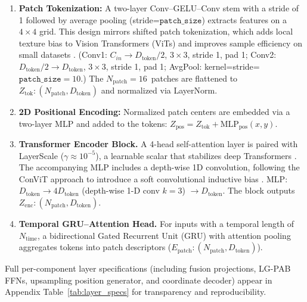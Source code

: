 \documentclass[remotesensing,article,accept,pdftex,moreauthors]{Definitions/mdpi}
\renewcommand{\hl}[1]{#1}
\begin{document}
\begin{enumerate}[leftmargin=*]
\item \textbf{\hl{Patch Tokenization:}}
      A two-layer Conv–GELU–Conv stem with a stride of 1 %
      followed by average pooling (stride=$\texttt{patch\_size}$) extracts features on a $4\times4$ grid. This design mirrors shifted patch tokenization, which adds local texture bias to Vision Transformers (ViTs) and improves sample efficiency on small datasets \cite{lee2021vision}.
 (Conv1: $C_{in}\rightarrow D_{\text{token}}/2$, $3\times3$, stride 1, pad 1; Conv2: $D_{\text{token}}/2\rightarrow D_{\text{token}}$, $3\times3$, stride 1, pad 1; AvgPool: kernel=stride=$\texttt{patch\_size}=10$.) The \mbox{$N_{\text{patch}}=16$ patches} are flattened to $Z_{\text{tok}}: (N_{\text{patch}}, D_{\text{token}})$ and normalized via LayerNorm.


\item \textbf{\hl{2D Positional Encoding:}}
      Normalized patch centers are embedded via a two-layer MLP and added to the tokens: $Z_{\text{pos}} = Z_{\text{tok}} + \text{MLP}_{\text{pos}}(x,y)$.

\item \textbf{\hl{Transformer Encoder Block.}}
      A 4-head self-attention layer is paired with LayerScale ($\gamma \approx 10^{-5}$), a learnable scalar that stabilizes deep Transformers \cite{touvron2021going}. The accompanying MLP includes a depth-wise 1D convolution, following the ConViT approach to introduce a soft convolutional inductive bias \cite{dascoli2021convit}. MLP: $D_{\text{token}} \rightarrow 4 D_{\text{token}}$ (depth-wise 1-D conv $k=3$) $\rightarrow D_{\text{token}}$. The block outputs $Z_{\text{enc}}: (N_{\text{patch}}, D_{\text{token}})$.



\item \textbf{\hl{Temporal GRU–Attention Head.}}
      For inputs with a temporal length of $N_{\text{time}}$, a bidirectional Gated Recurrent Unit (GRU) with attention pooling aggregates tokens into patch descriptors ($E_{\text{patch}}: (N_{\text{patch}}, D_{\text{token}})$).
\end{enumerate}

Full per-component layer specifications (including fusion projections, LG-PAB FFNs, upsampling position generator, and coordinate decoder) appear in Appendix Table~\ref{tab:layer_specs} for transparency and reproducibility.
\end{document}
